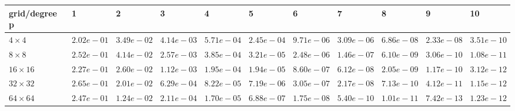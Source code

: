 \begin{tabular}{lllllllllll}
\hline
 grid/degree p   & 1          & 2          & 3          & 4          & 5          & 6          & 7          & 8          & 9          & 10         \\
\hline
 $4 \times 4$    & $2.02e-01$ & $3.49e-02$ & $4.14e-03$ & $5.71e-04$ & $2.45e-04$ & $9.71e-06$ & $3.09e-06$ & $6.86e-08$ & $2.33e-08$ & $3.51e-10$ \\
 $8 \times 8$    & $2.52e-01$ & $4.14e-02$ & $2.57e-03$ & $3.85e-04$ & $3.21e-05$ & $2.48e-06$ & $1.46e-07$ & $6.10e-09$ & $3.06e-10$ & $1.08e-11$ \\
 $16 \times 16$  & $2.27e-01$ & $2.60e-02$ & $1.12e-03$ & $1.95e-04$ & $1.94e-05$ & $8.60e-07$ & $6.12e-08$ & $2.05e-09$ & $1.17e-10$ & $3.12e-12$ \\
 $32 \times 32$  & $2.65e-01$ & $2.01e-02$ & $6.29e-04$ & $8.22e-05$ & $7.19e-06$ & $3.05e-07$ & $2.17e-08$ & $7.13e-10$ & $4.12e-11$ & $1.15e-12$ \\
 $64 \times 64$  & $2.47e-01$ & $1.24e-02$ & $2.11e-04$ & $1.70e-05$ & $6.88e-07$ & $1.75e-08$ & $5.40e-10$ & $1.01e-11$ & $7.42e-13$ & $1.23e-12$ \\
\hline
\end{tabular}